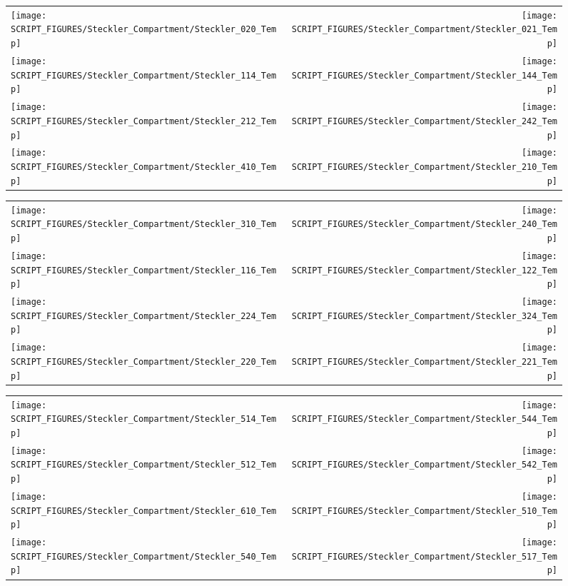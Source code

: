 \begin{figure}[!ht]
\begin{tabular*}{\textwidth}{l@{\extracolsep{\fill}}r}
\texttt{[image: SCRIPT\_FIGURES/Steckler\_Compartment/Steckler\_020\_Temp]} &
\texttt{[image: SCRIPT\_FIGURES/Steckler\_Compartment/Steckler\_021\_Temp]} \\
\texttt{[image: SCRIPT\_FIGURES/Steckler\_Compartment/Steckler\_114\_Temp]} &
\texttt{[image: SCRIPT\_FIGURES/Steckler\_Compartment/Steckler\_144\_Temp]} \\
\texttt{[image: SCRIPT\_FIGURES/Steckler\_Compartment/Steckler\_212\_Temp]} &
\texttt{[image: SCRIPT\_FIGURES/Steckler\_Compartment/Steckler\_242\_Temp]} \\
\texttt{[image: SCRIPT\_FIGURES/Steckler\_Compartment/Steckler\_410\_Temp]} &
\texttt{[image: SCRIPT\_FIGURES/Steckler\_Compartment/Steckler\_210\_Temp]}
\end{tabular*}
\end{figure}

\begin{figure}[!ht]
\begin{tabular*}{\textwidth}{l@{\extracolsep{\fill}}r}
\texttt{[image: SCRIPT\_FIGURES/Steckler\_Compartment/Steckler\_310\_Temp]} &
\texttt{[image: SCRIPT\_FIGURES/Steckler\_Compartment/Steckler\_240\_Temp]} \\
\texttt{[image: SCRIPT\_FIGURES/Steckler\_Compartment/Steckler\_116\_Temp]} &
\texttt{[image: SCRIPT\_FIGURES/Steckler\_Compartment/Steckler\_122\_Temp]} \\
\texttt{[image: SCRIPT\_FIGURES/Steckler\_Compartment/Steckler\_224\_Temp]} &
\texttt{[image: SCRIPT\_FIGURES/Steckler\_Compartment/Steckler\_324\_Temp]} \\
\texttt{[image: SCRIPT\_FIGURES/Steckler\_Compartment/Steckler\_220\_Temp]} &
\texttt{[image: SCRIPT\_FIGURES/Steckler\_Compartment/Steckler\_221\_Temp]}
\end{tabular*}
\end{figure}

\begin{figure}[!ht]
\begin{tabular*}{\textwidth}{l@{\extracolsep{\fill}}r}
\texttt{[image: SCRIPT\_FIGURES/Steckler\_Compartment/Steckler\_514\_Temp]} &
\texttt{[image: SCRIPT\_FIGURES/Steckler\_Compartment/Steckler\_544\_Temp]} \\
\texttt{[image: SCRIPT\_FIGURES/Steckler\_Compartment/Steckler\_512\_Temp]} &
\texttt{[image: SCRIPT\_FIGURES/Steckler\_Compartment/Steckler\_542\_Temp]} \\
\texttt{[image: SCRIPT\_FIGURES/Steckler\_Compartment/Steckler\_610\_Temp]} &
\texttt{[image: SCRIPT\_FIGURES/Steckler\_Compartment/Steckler\_510\_Temp]} \\
\texttt{[image: SCRIPT\_FIGURES/Steckler\_Compartment/Steckler\_540\_Temp]} &
\texttt{[image: SCRIPT\_FIGURES/Steckler\_Compartment/Steckler\_517\_Temp]}
\end{tabular*}
\end{figure}

